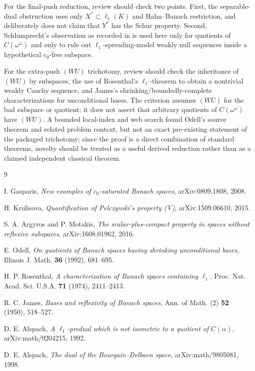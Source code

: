 \documentclass[11pt]{article}
\begin{document}
For the final-push reduction, review should check two points.  First, the separable-dual obstruction uses only \(X^*\subset \ell_1(K)\) and Hahn--Banach restriction, and deliberately does not claim that \(Y^*\) has the Schur property.  Second, Schlumprecht's observation as recorded in \cite{Odell} is used here only for quotients of \(C(\omega^\omega)\) and only to rule out \(\ell_1\)-spreading-model weakly null sequences inside a hypothetical \(c_0\)-free subspace.

For the extra-push \((WU)\) trichotomy, review should check the inheritance of \((WU)\) by subspaces, the use of Rosenthal's \(\ell_1\)-theorem to obtain a nontrivial weakly Cauchy sequence, and James's shrinking/boundedly-complete characterizations for unconditional bases.  The criterion assumes \((WU)\) for the bad subspace or quotient; it does not assert that arbitrary quotients of \(C(\omega^\omega)\) have \((WU)\).  A bounded local-index and web search found Odell's source theorem and related problem context, but not an exact pre-existing statement of the packaged trichotomy; since the proof is a direct combination of standard theorems, novelty should be treated as a useful derived reduction rather than as a claimed independent classical theorem.

\begin{thebibliography}{9}

I. Gasparis,
\emph{New examples of \(c_0\)-saturated Banach spaces},
arXiv:0809.1808, 2008.

H. Krulisova,
\emph{Quantification of Pelczynski's property (V)},
arXiv:1509.06610, 2015.

S. A. Argyros and P. Motakis,
\emph{The scalar-plus-compact property in spaces without reflexive subspaces},
arXiv:1608.01962, 2016.

E. Odell,
\emph{On quotients of Banach spaces having shrinking unconditional bases},
Illinois J. Math. \textbf{36} (1992), 681--695.

H. P. Rosenthal,
\emph{A characterization of Banach spaces containing \(\ell_1\)},
Proc. Nat. Acad. Sci. U.S.A. \textbf{71} (1974), 2411--2413.

R. C. James,
\emph{Bases and reflexivity of Banach spaces},
Ann. of Math. (2) \textbf{52} (1950), 518--527.

D. E. Alspach,
\emph{A \(\ell_1\)-predual which is not isometric to a quotient of \(C(\alpha)\)},
arXiv:math/9204215, 1992.

D. E. Alspach,
\emph{The dual of the Bourgain--Delbaen space},
arXiv:math/9805081, 1998.

\end{thebibliography}
\end{document}
